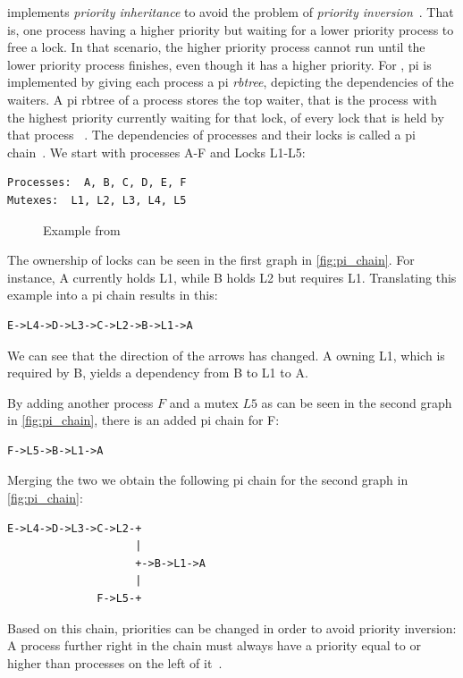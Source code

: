 \documentclass[10pt,twocolumn,a4paper]{article}
\begin{document}
 implements \emph{priority inheritance} to avoid the problem of \emph{priority inversion}~\cite{rostedt_rtmutex_2017}.
That is, one process having a higher priority but waiting for a lower priority process to free a lock.
In that scenario, the higher priority process cannot run until the lower priority process finishes, even though it has a higher priority.
For , \acrfull{pi} is implemented by giving each process a \acrshort{pi} \emph{rbtree}, depicting the dependencies of the waiters.
A \acrshort{pi} rbtree of a process stores the top waiter, that is the process with the highest priority currently waiting for that lock, of every lock that is held by that process ~\cite{rostedt_rtmutex_2017}.
The dependencies of processes and their locks is called a \acrshort{pi} chain~\cite{rostedt_rtmutex_2017}.
We start with processes A-F and Locks L1-L5:
\lstset{basicstyle=\small}
\begin{lstlisting}[caption={Example from~\cite{rostedt_rtmutex_2017}}]
Processes:  A, B, C, D, E, F
Mutexes:  L1, L2, L3, L4, L5
\end{lstlisting}
\begin{figure}[htb]
  \centering
  
  \caption{Example from~\cite{rostedt_rtmutex_2017}}
  \label{fig:pi_chain}
\end{figure}
The ownership of locks can be seen in the first graph in \autoref{fig:pi_chain}.
For instance, A currently holds L1, while B holds L2 but requires L1.
Translating this example into a \acrshort{pi} chain results in this:
\begin{lstlisting}[caption={Simple \acrshort{pi} chain~\cite{rostedt_rtmutex_2017}}]
E->L4->D->L3->C->L2->B->L1->A
\end{lstlisting}
We can see that the direction of the arrows has changed.
A owning L1, which is required by B, yields a dependency from B to L1 to A.

By adding another process $F$ and a mutex $L5$ as can be seen in the second graph in \autoref{fig:pi_chain}, there is an added \acrshort{pi} chain for F:
\begin{lstlisting}[caption={Second \acrshort{pi} chain~\cite{rostedt_rtmutex_2017}}]
F->L5->B->L1->A
\end{lstlisting}
Merging the two we obtain the following \acrshort{pi} chain for the second graph in \autoref{fig:pi_chain}:
\begin{lstlisting}[caption={\acrshort{pi} chain~\cite{rostedt_rtmutex_2017}}]
E->L4->D->L3->C->L2-+
                    |
                    +->B->L1->A
                    |
              F->L5-+
\end{lstlisting}
Based on this chain, priorities can be changed in order to avoid priority inversion:
A process further right in the chain must always have a priority equal to or higher than processes on the left of it~\cite{rostedt_rtmutex_2017}.
\newline
\end{document}
